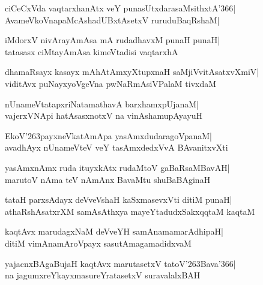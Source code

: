 \documentclass[twoside,12pt,openright]{book}
\def\S{\char'263}
\newcounter{shloka}[chapter]
\begin{document}
\begin{shloka}%
ciCeCxVda vaqtarxhanAtx veY punasUtxdarasaMsithxtA\char'366|\\
AvameVkoVnapaMcAshadUBxtAsetxV ruruduBaqRshaM|
\end{shloka}

\begin{shloka}%
iMdorxV nivArayAmAsa mA rudadhavxM punaH punaH|\\
tatasasx ciMtayAmAsa kimeVtadisi vaqtarxhA
\end{shloka}

\begin{shloka}%
dhamaRsayx kasayx mAhAtAmxyXtupxnaH saMjiVvitAsatxvXmiV|\\
viditAvx puNayxyoVgeVna pwNaRmAsiVPalaM tivxdaM
\end{shloka}

\begin{shloka}%
nUnameVtatapxriNatamathavA barxhamxpUjanaM|\\
vajerxVNApi hatAsasxnotxV na vinAshamupAyayuH
\end{shloka}

\begin{shloka}%
EkoV\S payxneVkatAmApa yasAmxdudaragoVpanaM|\\
avadhAyx nUnameVteV veY tasAmxdedxVvA BAvanitxvXti
\end{shloka}

\begin{shloka}%
yasAmxnAmx ruda ituyxkAtx rudaMtoV gaBaRsaMBavAH|\\
marutoV nAma teV nAmAnx BavaMtu shuBaBAginaH
\end{shloka}

\begin{shloka}%
tataH parxsAdayx deVveVshaH kaSxmasevxVti ditiM punaH|\\
athaRshAsatxrXM samAsAthxya mayeYtadudxSakxqqtaM kaqtaM
\end{shloka}

\begin{shloka}%
kaqtAvx marudagxNaM deVveYH samAnamamarAdhipaH|\\
ditiM vimAnamAroVpayx sasutAmagamadidxvaM
\end{shloka}

\begin{shloka}%
yajacnxBAgaBujaH kaqtAvx marutasetxV tatoV\S Bava\char'366|\\
na jagumxreYkayxmasureYratasetxV suravalalxBAH
\end{shloka}
\end{document}
